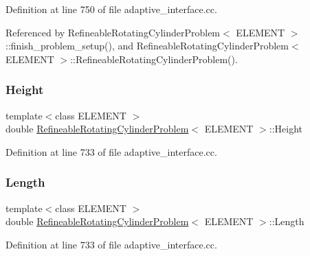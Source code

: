 Definition at line 750 of file adaptive\+\_\+interface.\+cc.



Referenced by Refineable\+Rotating\+Cylinder\+Problem$<$ E\+L\+E\+M\+E\+N\+T $>$\+::finish\+\_\+problem\+\_\+setup(), and Refineable\+Rotating\+Cylinder\+Problem$<$ E\+L\+E\+M\+E\+N\+T $>$\+::\+Refineable\+Rotating\+Cylinder\+Problem().

\mbox{\label{classRefineableRotatingCylinderProblem_a3521efd0bfad036e20a6a8ba7e4547f4}} 
\subsubsection{\texorpdfstring{Height}{Height}}
{\footnotesize\ttfamily template$<$class E\+L\+E\+M\+E\+NT $>$ \\
double \hyperlink{classRefineableRotatingCylinderProblem}{Refineable\+Rotating\+Cylinder\+Problem}$<$ E\+L\+E\+M\+E\+NT $>$\+::Height\hspace{0.3cm}{\ttfamily [private]}}



Definition at line 733 of file adaptive\+\_\+interface.\+cc.

\mbox{\label{classRefineableRotatingCylinderProblem_acfa616d36346f557244146d4b2db9197}} 
\subsubsection{\texorpdfstring{Length}{Length}}
{\footnotesize\ttfamily template$<$class E\+L\+E\+M\+E\+NT $>$ \\
double \hyperlink{classRefineableRotatingCylinderProblem}{Refineable\+Rotating\+Cylinder\+Problem}$<$ E\+L\+E\+M\+E\+NT $>$\+::Length\hspace{0.3cm}{\ttfamily [private]}}



Definition at line 733 of file adaptive\+\_\+interface.\+cc.

